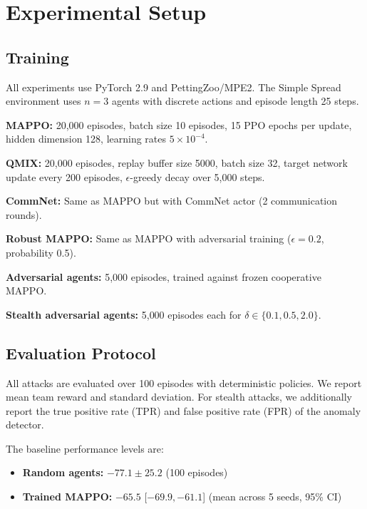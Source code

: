 \documentclass[12pt,a4paper]{article}
\begin{document}
\section{Experimental Setup}
\label{sec:experiments}

\subsection{Training}

All experiments use PyTorch 2.9 and PettingZoo/MPE2. The Simple Spread environment uses $n=3$ agents with discrete actions and episode length 25 steps.

\textbf{MAPPO:} 20{,}000 episodes, batch size 10 episodes, 15 PPO epochs per update, hidden dimension 128, learning rates $5 \times 10^{-4}$.

\textbf{QMIX:} 20{,}000 episodes, replay buffer size 5000, batch size 32, target network update every 200 episodes, $\epsilon$-greedy decay over 5{,}000 steps.

\textbf{CommNet:} Same as MAPPO but with CommNet actor (2 communication rounds).

\textbf{Robust MAPPO:} Same as MAPPO with adversarial training ($\epsilon = 0.2$, probability 0.5).

\textbf{Adversarial agents:} 5{,}000 episodes, trained against frozen cooperative MAPPO.

\textbf{Stealth adversarial agents:} 5{,}000 episodes each for $\delta \in \{0.1, 0.5, 2.0\}$.

\subsection{Evaluation Protocol}

All attacks are evaluated over 100 episodes with deterministic policies. We report mean team reward and standard deviation. For stealth attacks, we additionally report the true positive rate (TPR) and false positive rate (FPR) of the anomaly detector.

The baseline performance levels are:
\begin{itemize}
    \item \textbf{Random agents:} $-77.1 \pm 25.2$ (100 episodes)
    \item \textbf{Trained MAPPO:} $-65.5$ [$-69.9, -61.1$] (mean across 5 seeds, 95\% CI)
\end{itemize}
\end{document}
